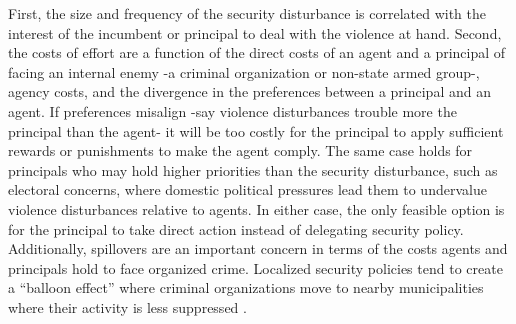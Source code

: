 \documentclass[12pt]{amsart}
\numberwithin{equation}{section}
\theoremstyle{definition}
\theoremstyle{definition}
\theoremstyle{definition}
\begin{document}
First, the size and frequency of the security disturbance is correlated with the interest of the incumbent or principal to deal with the violence at hand. Second, the costs of effort are a function of the direct costs of an agent and a principal of facing an internal enemy -a criminal organization or non-state armed group-, agency costs, and the divergence in the preferences between a principal and an agent. If preferences misalign -say violence disturbances trouble more the principal than the agent- it will be too costly for the principal to apply sufficient rewards or punishments to make the agent comply. The same case holds for principals who may hold higher priorities than the security disturbance, such as electoral concerns, where domestic political pressures lead them to undervalue violence disturbances relative to agents. In either case, the only feasible option is for the principal to take direct action instead of delegating security policy. Additionally, spillovers are an important concern in terms of the costs agents and principals hold to face organized crime. Localized security policies tend to create a ``balloon effect'' where criminal organizations move to nearby municipalities where their activity is less suppressed \citep{shirk_wallman_2015}.
\end{document}
